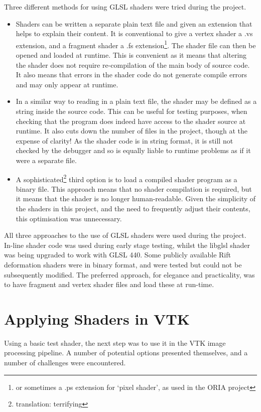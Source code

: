 \documentclass[MSc,paper=a4,pagesize=auto]{icldt}
\begin{document}
Three different methods for using GLSL shaders were tried during the project. 
\begin{itemize}
\item Shaders can be written a separate plain text file and given an extension that helps to explain their content. It is conventional to give a vertex shader a .vs extension, and a fragment shader a .fs extension\footnote{or sometimes a .ps extension for `pixel shader', as used in the ORIA project}. The shader file can then be opened and loaded at runtime. This is convenient as it means that altering the shader does not require re-compilation of the main body of source code. It also means that errors in the shader code do not generate compile errors and may only appear at runtime. 
\item In a similar way to reading in a plain text file, the shader may be defined as a string inside the source code. This can be useful for testing purposes, when checking that the program does indeed have access to the shader source at runtime. It also cuts down the number of files in the project, though at the expense of clarity! As the shader code is in string format, it is still not checked by the debugger and so is equally liable to runtime problems as if it were a separate file.
\item A sophisticated\footnote{translation: terrifying} third option is to load a compiled shader program as a binary file. This approach means that no shader compilation is required, but it means that the shader is no longer human-readable. Given the simplicity of the shaders in this project, and the need to frequently adjust their contents, this optimisation was unnecessary.
\end{itemize}

All three approaches to the use of GLSL shaders were used during the project. In-line shader code was used during early stage testing, whilst the libglsl shader was being upgraded to work with GLSL 440. Some publicly available Rift deformation shaders were in binary format, and were tested but could not be subsequently modified. The preferred approach, for elegance and practicality, was to have fragment and vertex shader files and load these at run-time.


\section{Applying Shaders in VTK}

Using a basic test shader, the next step was to use it in the VTK image processing pipeline. A number of potential options presented themselves, and a number of challenges were encountered.
\end{document}
